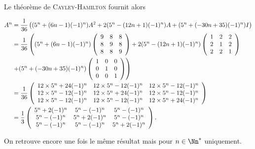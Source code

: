{{Le théorème de \textsc{Cayley}-\textsc{Hamilton} fournit alors

\begin{align*}\ensuremath
A^n&=\frac{1}{36}\left((5^n+(6n-1)(-1)^n)A^2+2(5^n-(12n+1)(-1)^n)A+(5^n+(-30n+35)(-1)^n)I\right)
\\
     &=\frac{1}{36}\left((5^n+(6n-1)(-1)^n)
\left(
\begin{array}{ccc}
9&8&8\\
8&9&8\\
8&8&9
\end{array}
\right)+2(5^n-(12n+1)(-1)^n)\left(
\begin{array}{ccc}
1&2&2\\
2&1&2\\
2&2&1
\end{array}
\right)\right.\\
 &\left.+(5^n+(-30n+35)(-1)^n)\left(
\begin{array}{ccc}
1&0&0\\
0&1&0\\
0&0&1
\end{array}
\right)\right)\\
     &=\frac{1}{36}\left(
\begin{array}{ccc}
12\times5^n+24(-1)^n&12\times5^n-12(-1)^n&12\times5^n-12(-1)^n\\
12\times5^n-12(-1)^n&12\times5^n+24(-1)^n&12\times5^n-12(-1)^n\\
12\times5^n-12(-1)^n&12\times5^n-12(-1)^n&12\times5^n+24(-1)^n
\end{array}
\right)\\
 &=\frac{1}{3}\left(
\begin{array}{ccc}
5^n+2(-1)^n&5^n-(-1)^n&5^n-(-1)^n\\
5^n-(-1)^n&5^n+2(-1)^n&5^n-(-1)^n\\
5^n-(-1)^n&5^n-(-1)^n&5^n+2(-1)^n
\end{array}
\right).
\end{align*}

On retrouve encore une fois le même résultat mais pour $n\in\Nn^*$ uniquement.
}
}
